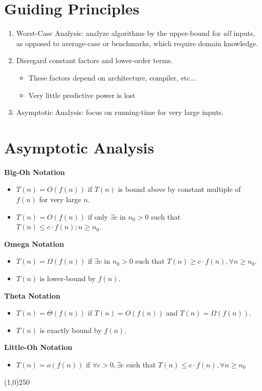 \documentclass[11pt]{article}
\begin{document}
\section{Guiding Principles}
	\begin{enumerate}
		\item {} Worst-Case Analysis: analyze algorithms by the upper-bound for \emph{all} inputs, as opposed to average-case or benchmarks, which require domain knowledge.
		\item Disregard constant factors and lower-order terms.
		\begin{itemize}
			\item These factors depend on architecture, compiler, etc$\ldots$
			\item Very little predictive power is lost
		\end{itemize}
		\item Asymptotic Analysis: focus on running-time for very large inputs.
	\end{enumerate}
	
\section{Asymptotic Analysis}
	\textbf{Big-Oh Notation}
	\begin{itemize}
		\item $T(n) = O(f(n))$ if $T(n)$ is bound above by constant multiple of $f(n)$ for very large $n$.
		\item $T(n) = O(f(n))$ if only $\exists c$ in $n_0 > 0$ such that $T(n) \leq c\cdot f(n); n\geq n_0$.
	\end{itemize}
	\textbf{Omega Notation}
	\begin{itemize}
		\item $T(n) = \Omega (f(n))$ if $\exists c$ in $n_0 > 0$ such that $T(n) \geq c\cdot f(n), \forall n\geq n_0$.
		\item $T(n)$ is lower-bound by $f(n)$.
	\end{itemize}
	\textbf{Theta Notation}
	\begin{itemize}
		\item $T(n) = \Theta (f(n))$ if $T(n) = O(f(n))$ and $T(n)=\Omega (f(n))$.
		\item $T(n)$ is exactly bound by $f(n)$.
	\end{itemize}
	\textbf{Little-Oh Notation}
	\begin{itemize}
		\item $T(n) = o(f(n))$ if $\forall c > 0, \exists c$ such that $T(n) \leq c\cdot f(n), \forall n\geq n_0$
	\end{itemize}
	
	\line(1,0){250}
	\def\enotesize{\normalsize}
	\theendnotes
\end{document}
